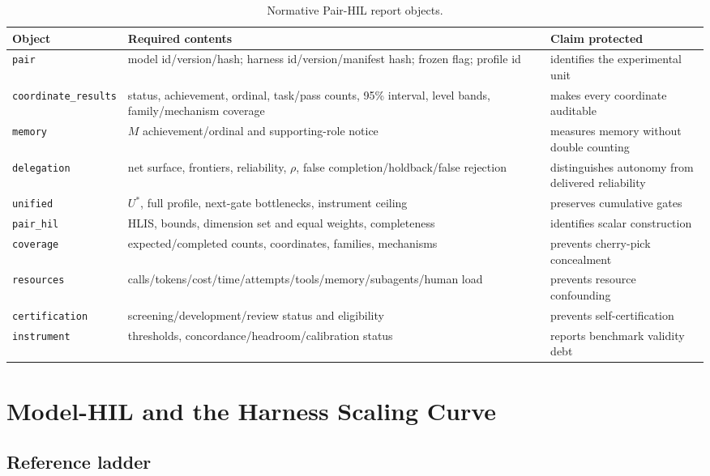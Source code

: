\documentclass[11pt]{article}
\theoremstyle{definition}
\begin{document}
\begin{table}[H]
\centering\scriptsize
\begin{tabularx}{\textwidth}{@{}p{}YY@{}}
\toprule
Object & Required contents & Claim protected \\
\midrule
\texttt{pair} & model id/version/hash; harness id/version/manifest hash; frozen flag; profile id & identifies the experimental unit \\
\texttt{coordinate\_results} & status, achievement, ordinal, task/pass counts, 95\% interval, level bands, family/mechanism coverage & makes every coordinate auditable \\
\texttt{memory} & $M$ achievement/ordinal and supporting-role notice & measures memory without double counting \\
\texttt{delegation} & net surface, frontiers, reliability, $\rho$, false completion/holdback/false rejection & distinguishes autonomy from delivered reliability \\
\texttt{unified} & $U^*$, full profile, next-gate bottlenecks, instrument ceiling & preserves cumulative gates \\
\texttt{pair\_hil} & HLIS, bounds, dimension set and equal weights, completeness & identifies scalar construction \\
\texttt{coverage} & expected/completed counts, coordinates, families, mechanisms & prevents cherry-pick concealment \\
\texttt{resources} & calls/tokens/cost/time/attempts/tools/memory/subagents/human load & prevents resource confounding \\
\texttt{certification} & screening/development/review status and eligibility & prevents self-certification \\
\texttt{instrument} & thresholds, concordance/headroom/calibration status & reports benchmark validity debt \\
\bottomrule
\end{tabularx}
\caption{Normative Pair-HIL report objects.}
\label{tab:report}
\end{table}

\section{Model-HIL and the Harness Scaling Curve}\label{sec:modelhil}

\subsection{Reference ladder}
\end{document}
